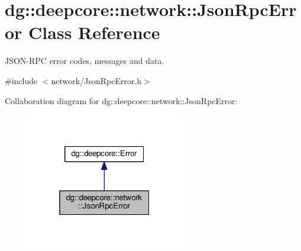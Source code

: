 \hypertarget{classdg_1_1deepcore_1_1network_1_1_json_rpc_error}{}\section{dg\+:\+:deepcore\+:\+:network\+:\+:Json\+Rpc\+Error Class Reference}
\label{classdg_1_1deepcore_1_1network_1_1_json_rpc_error}


J\+S\+O\+N-\/\+R\+PC error codes, messages and data.  




{\ttfamily \#include $<$network/\+Json\+Rpc\+Error.\+h$>$}



Collaboration diagram for dg\+:\+:deepcore\+:\+:network\+:\+:Json\+Rpc\+Error\+:
\nopagebreak
\begin{figure}[H]
\begin{center}
\leavevmode
\includegraphics[width=193pt]{classdg_1_1deepcore_1_1network_1_1_json_rpc_error__coll__graph}
\end{center}
\end{figure}
